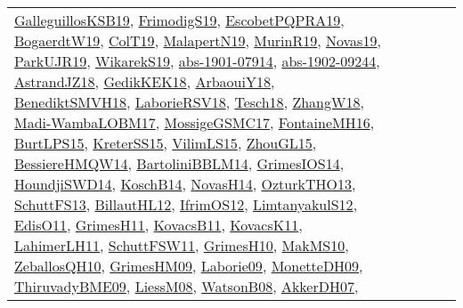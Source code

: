 {\begin{longtable}{lp{3cm}>{\raggedright}p{6cm}>{\raggedright}p{6cm}p{8cm}}
\href{papers/GalleguillosKSB19.pdf}{GalleguillosKSB19}\cite{GalleguillosKSB19}, \href{papers/FrimodigS19.pdf}{FrimodigS19}\cite{FrimodigS19}, \href{articles/EscobetPQPRA19.pdf}{EscobetPQPRA19}\cite{EscobetPQPRA19}, \href{papers/BogaerdtW19.pdf}{BogaerdtW19}\cite{BogaerdtW19}, \href{papers/ColT19.pdf}{ColT19}\cite{ColT19}, \href{papers/MalapertN19.pdf}{MalapertN19}\cite{MalapertN19}, \href{papers/MurinR19.pdf}{MurinR19}\cite{MurinR19}, \href{articles/Novas19.pdf}{Novas19}\cite{Novas19}, \href{papers/ParkUJR19.pdf}{ParkUJR19}\cite{ParkUJR19}, \href{articles/WikarekS19.pdf}{WikarekS19}\cite{WikarekS19}, \href{articles/abs-1901-07914.pdf}{abs-1901-07914}\cite{abs-1901-07914}, \href{articles/abs-1902-09244.pdf}{abs-1902-09244}\cite{abs-1902-09244}, \href{papers/AstrandJZ18.pdf}{AstrandJZ18}\cite{AstrandJZ18}, \href{articles/GedikKEK18.pdf}{GedikKEK18}\cite{GedikKEK18}, \href{papers/ArbaouiY18.pdf}{ArbaouiY18}\cite{ArbaouiY18}, \href{papers/BenediktSMVH18.pdf}{BenediktSMVH18}\cite{BenediktSMVH18}, \href{articles/LaborieRSV18.pdf}{LaborieRSV18}\cite{LaborieRSV18}, \href{papers/Tesch18.pdf}{Tesch18}\cite{Tesch18}, \href{articles/ZhangW18.pdf}{ZhangW18}\cite{ZhangW18}, \href{papers/Madi-WambaLOBM17.pdf}{Madi-WambaLOBM17}\cite{Madi-WambaLOBM17}, \href{papers/MossigeGSMC17.pdf}{MossigeGSMC17}\cite{MossigeGSMC17}, \href{papers/FontaineMH16.pdf}{FontaineMH16}\cite{FontaineMH16}, \href{papers/BurtLPS15.pdf}{BurtLPS15}\cite{BurtLPS15}, \href{papers/KreterSS15.pdf}{KreterSS15}\cite{KreterSS15}, \href{papers/VilimLS15.pdf}{VilimLS15}\cite{VilimLS15}, \href{papers/ZhouGL15.pdf}{ZhouGL15}\cite{ZhouGL15}, \href{papers/BessiereHMQW14.pdf}{BessiereHMQW14}\cite{BessiereHMQW14}, \href{papers/BartoliniBBLM14.pdf}{BartoliniBBLM14}\cite{BartoliniBBLM14}, \href{articles/GrimesIOS14.pdf}{GrimesIOS14}\cite{GrimesIOS14}, \href{papers/HoundjiSWD14.pdf}{HoundjiSWD14}\cite{HoundjiSWD14}, \href{papers/KoschB14.pdf}{KoschB14}\cite{KoschB14}, \href{articles/NovasH14.pdf}{NovasH14}\cite{NovasH14}, \href{articles/OzturkTHO13.pdf}{OzturkTHO13}\cite{OzturkTHO13}, \href{papers/SchuttFS13.pdf}{SchuttFS13}\cite{SchuttFS13}, \href{papers/BillautHL12.pdf}{BillautHL12}\cite{BillautHL12}, \href{papers/IfrimOS12.pdf}{IfrimOS12}\cite{IfrimOS12}, \href{articles/LimtanyakulS12.pdf}{LimtanyakulS12}\cite{LimtanyakulS12}, \href{papers/EdisO11.pdf}{EdisO11}\cite{EdisO11}, \href{papers/GrimesH11.pdf}{GrimesH11}\cite{GrimesH11}, \href{articles/KovacsB11.pdf}{KovacsB11}\cite{KovacsB11}, \href{articles/KovacsK11.pdf}{KovacsK11}\cite{KovacsK11}, \href{papers/LahimerLH11.pdf}{LahimerLH11}\cite{LahimerLH11}, \href{articles/SchuttFSW11.pdf}{SchuttFSW11}\cite{SchuttFSW11}, \href{papers/GrimesH10.pdf}{GrimesH10}\cite{GrimesH10}, \href{papers/MakMS10.pdf}{MakMS10}\cite{MakMS10}, \href{articles/ZeballosQH10.pdf}{ZeballosQH10}\cite{ZeballosQH10}, \href{papers/GrimesHM09.pdf}{GrimesHM09}\cite{GrimesHM09}, \href{papers/Laborie09.pdf}{Laborie09}\cite{Laborie09}, \href{papers/MonetteDH09.pdf}{MonetteDH09}\cite{MonetteDH09}, \href{papers/ThiruvadyBME09.pdf}{ThiruvadyBME09}\cite{ThiruvadyBME09}, \href{articles/LiessM08.pdf}{LiessM08}\cite{LiessM08}, \href{papers/WatsonB08.pdf}{WatsonB08}\cite{WatsonB08}, \href{papers/AkkerDH07.pdf}{AkkerDH07}\cite{AkkerDH07}, 
\end{longtable}}
